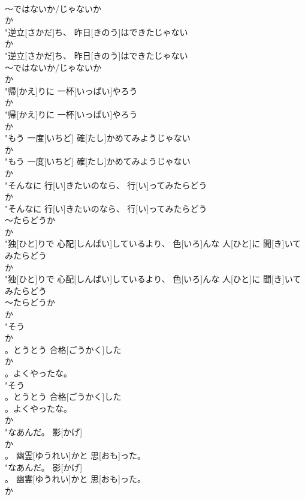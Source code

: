 \documentclass[8pt]{extreport}
\begin{document}
\begin{CJK}{UTF8}{min}
\\	～ではないか/じゃないか 
\\	か
\\	"逆立[さかだ]ち、 昨日[きのう]はできたじゃない
\\	か
\\	"逆立[さかだ]ち、 昨日[きのう]はできたじゃない
\\	～ではないか/じゃないか 
\\	か
\\	"帰[かえ]りに 一杯[いっぱい]やろう
\\	か
\\	"帰[かえ]りに 一杯[いっぱい]やろう
\\	か
\\	"もう 一度[いちど] 確[たし]かめてみようじゃない
\\	か
\\	"もう 一度[いちど] 確[たし]かめてみようじゃない
\\	か
\\	"そんなに 行[い]きたいのなら、 行[い]ってみたらどう
\\	か
\\	"そんなに 行[い]きたいのなら、 行[い]ってみたらどう
\\	～たらどうか 
\\	か
\\	"独[ひと]りで 心配[しんぱい]しているより、 色[いろ]んな 人[ひと]に 聞[き]いてみたらどう
\\	か
\\	"独[ひと]りで 心配[しんぱい]しているより、 色[いろ]んな 人[ひと]に 聞[き]いてみたらどう
\\	～たらどうか 
\\	か
\\	"そう
\\	か
\\	。とうとう 合格[ごうかく]した
\\	か
\\	。よくやったな。
\\	"そう
\\	。とうとう 合格[ごうかく]した
\\	。よくやったな。
\\	か
\\	"なあんだ。 影[かげ]
\\	か
\\	。 幽霊[ゆうれい]かと 思[おも]った。
\\	"なあんだ。 影[かげ]
\\	。 幽霊[ゆうれい]かと 思[おも]った。
\\	か

\end{CJK}
\end{document}
